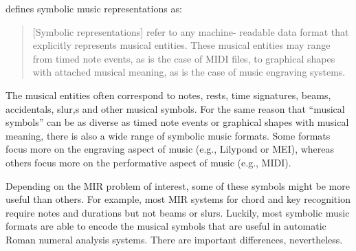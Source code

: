 

\textcite{muller2015music} defines symbolic music
representations as:

\begin{quote}
[Symbolic representations] refer to any machine- readable
data format that explicitly represents musical entities.
These musical entities may range from timed note events, as
is the case of MIDI ﬁles, to graphical shapes with attached
musical meaning, as is the case of music engraving systems.
\end{quote}


The musical entities often correspond to notes, rests, time
signatures, beams, accidentals, slur,s and other musical
symbols. For the same reason that ``musical symbols'' can be
as diverse as timed note events or graphical shapes with
musical meaning, there is also a wide range of symbolic
music formats. Some formats focus more on the engraving
aspect of music (e.g., Lilypond or MEI), whereas others
focus more on the performative aspect of music (e.g., MIDI).

Depending on the MIR problem of interest, some of these
symbols might be more useful than others. For example, most
MIR systems for chord and key recognition require notes and
durations but not beams or slurs. Luckily, most symbolic
music formats are able to encode the musical symbols that are useful in automatic Roman numeral analysis systems. There are important differences, nevertheless.
